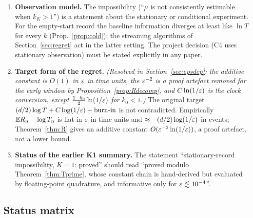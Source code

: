 \begin{enumerate}[nosep]
\item \textbf{Observation model.} The impossibility (``$\mu$ is not consistently estimable when $k_K>1$'') is a statement about the stationary or conditional experiment. For the empty-start record the baseline information diverges at least like $\ln T$ for every $k$ (Prop.~\ref{prop:cold}); the streaming algorithms of Section~\ref{sec:regret} act in the latter setting. The project decision (C4 uses stationary observation) must be stated explicitly in any paper.
\item \textbf{Target form of the regret.} \emph{(Resolved in Section~\ref{sec:epsdep}: the additive constant is $O(1)$ in $\varepsilon$ in time units, the $\varepsilon^{-2}$ is a proof artefact removed for the early window by Proposition~\ref{prop:Rdecomp}, and $C\ln(1/\varepsilon)$ is the clock conversion, except $\tfrac{1-k_0}2\ln(1/\varepsilon)$ for $k_0<1$.)} The original target $(d/2)\log T+C\log(1/\varepsilon)+\text{burn-in}$ is not contradicted. Empirically $\mathbb{E} R_n-\log T_n$ is flat in $\varepsilon$ in time units and $\approx-(d/2)\log(1/\varepsilon)$ in events; Theorem~\ref{thm:R} gives an additive constant $O(\varepsilon^{-2}\ln(1/\varepsilon))$, a proof artefact, not a lower bound.
\item \textbf{Status of the earlier K1 summary.} The statement ``stationary-record impossibility, $K=1$: proved'' should read ``proved modulo Theorem~\ref{thm:Tprime}, whose constant chain is hand-derived but evaluated by floating-point quadrature, and informative only for $\varepsilon\lesssim10^{-4}$''.
\end{enumerate}

\subsection{Status matrix}


